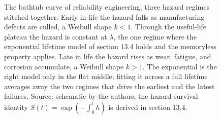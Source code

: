 \begin{figure}[htbp]
\begin{tikzpicture}[x=1.05cm, y=1.05cm, font=\small]
\end{tikzpicture}
\caption[The bathtub hazard curve]{The bathtub curve of reliability
engineering, three hazard regimes stitched together. Early in life the
hazard falls as manufacturing defects are culled, a Weibull shape
$k<1$. Through the useful-life plateau the hazard is constant at
$\lambda$, the one regime where the exponential lifetime model of
section 13.4 holds and the memoryless property applies. Late in life
the hazard rises as wear, fatigue, and corrosion accumulate, a Weibull
shape $k>1$. The exponential is the right model only in the flat middle;
fitting it across a full lifetime averages away the two regimes that
drive the earliest and the latest failures. Source: schematic by the
authors; the hazard-survival identity $S(t)=\exp(-\int_0^t h)$ is
derived in section 13.4.}
\label{fig:vol02ch13:hazard-bathtub}
\end{figure}
